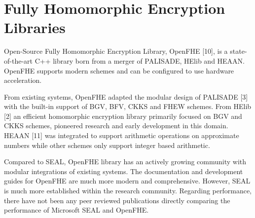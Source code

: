 \section{Fully Homomorphic Encryption Libraries}

Open-Source Fully Homomorphic Encryption Library, OpenFHE [10], is a state-of-the-art C++ library born from a merger of PALISADE, HElib and HEAAN. OpenFHE supports modern schemes and can be configured to use hardware acceleration.

From existing systems, OpenFHE adapted the modular design of PALISADE [3] with the built-in support of BGV, BFV, CKKS and FHEW schemes. From HElib [2] an efficient homomorphic encryption library primarily focused on BGV and CKKS schemes, pioneered research and early development in this domain. HEAAN [11] was integrated to support arithmetic operations on approximate numbers while other schemes only support integer based arithmetic.

Compared to SEAL, OpenFHE library has an actively growing community with modular integrations of existing systems. The documentation and development guides for OpenFHE are much more modern and comprehensive. However, SEAL is much more established within the research community. Regarding performance, there have not been any peer reviewed publications directly comparing the performance of Microsoft SEAL and OpenFHE.
